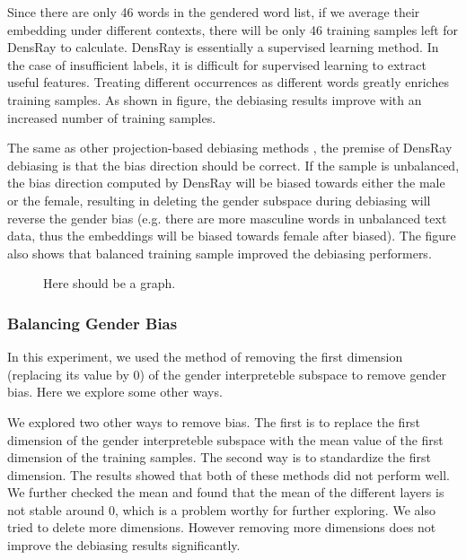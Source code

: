 Since there are only 46 words in the gendered word list, if we average their embedding under different contexts, there will be only 46 training samples left for DensRay to calculate. DensRay is essentially a supervised learning method. In the case of insufficient labels, it is difficult for supervised learning to extract useful features. Treating different occurrences as different words greatly enriches training samples. As shown in figure, the debiasing results improve with an increased number of training samples.

The same as other projection-based debiasing methods \citep{bolukbasi2016man,zhao2019gender,dev2019attenuating, karve2019conceptor}, the premise of DensRay debiasing is that the bias direction should be correct. If the sample is unbalanced, the bias direction computed by DensRay will be biased towards either the male or the female, resulting in deleting the gender subspace during debiasing will reverse the gender bias (e.g. there are more masculine words in unbalanced text data, thus the embeddings will be biased towards female after biased). The figure also shows that balanced training sample improved the debiasing performers. 
\begin{figure}
    \centering
    \caption{Here should be a graph.}
    \label{fig:my_label}
\end{figure}

\subsubsection{Balancing Gender Bias}
In this experiment, we used the method of removing the first dimension (replacing its value by $0$) of the gender interpreteble subspace to remove gender bias. Here we explore some other ways.

We explored two other ways to remove bias. The first is to replace the first dimension of the gender interpreteble subspace with the mean value of the first dimension of the training samples. The second way is to standardize the first dimension. The results showed that both of these methods did not perform well. We further checked the mean and found that the mean of the different layers is not stable around 0, which is a problem worthy for further exploring. We also tried to delete more dimensions. However removing more dimensions does not improve the debiasing results significantly.


